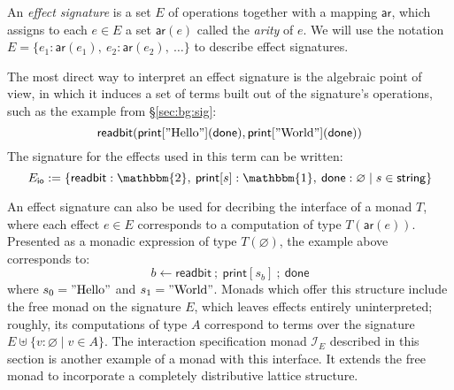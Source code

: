 \documentclass[format=sigplan,authordraft]{acmart}
\newcommand{\kw}[1]{\ensuremath{ \mathsf{#1} }}
\begin{document}
\begin{definition}
An \emph{effect signature}
is a set $E$ of operations
together with a mapping $\kw{ar}$,
which assigns to each $e \in E$ a set $\kw{ar}(e)$
called the \emph{arity} of $e$.
We will use the notation
$E = \{ e_1 : \kw{ar}(e_1), \: e_2 : \kw{ar}(e_2), \: \ldots \}$
to describe effect signatures.
\end{definition}

The most direct way to interpret an effect signature
is the algebraic point of view,
in which it induces a set of terms
built out of the signature's operations,
such as the example from \S\ref{sec:bg:sig}:
\[
    \kw{readbit}(
      \kw{print}["\text{Hello}"](\kw{done}),
      \kw{print}["\text{World}"](\kw{done}))
\]
The signature for the effects used in this term
can be written:
\[
  E_\kw{io} :=
  \{ \kw{readbit} : \mathbbm{2}, \:
     \kw{print}[s] : \mathbbm{1}, \:
     \kw{done} : \varnothing \mid
     s \in \kw{string} \}
\]

An effect signature can also be used
for decribing the interface of a monad $T$,
where each effect $e \in E$ corresponds to
a computation of type $T(\kw{ar}(e))$.
Presented as a monadic expression of type $T(\varnothing)$,
the example above corresponds to:
\[
  b \leftarrow \kw{readbit} \: ; \:
  \kw{print}[s_b] \: ; \:
  \kw{done}
\]
where $s_0 = "\text{Hello}"$ and $s_1 = "\text{World}"$.
Monads which offer this structure
include the free monad on the signature $E$,
which leaves effects entirely uninterpreted;
roughly, its computations of type $A$
correspond to terms over the signature
$E \uplus \{ v : \varnothing \mid v \in A \}$.
The interaction specification monad $\mathcal{I}_E$
described in this section is another example
of a monad with this interface.
It extends the free monad
to incorporate
a completely distributive lattice structure.
\end{document}
